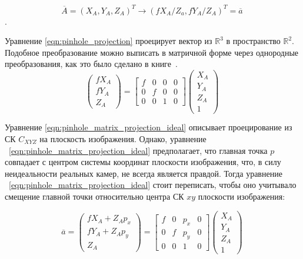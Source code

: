 \documentclass[12pt, a4paper]{article}
\begin{document}
\begin{equation}
    \overline{A} = (X_A, Y_A, Z_A)^T \rightarrow (fX_A/Z_a, fY_A/Z_A)^T = \overline{a} 
~\label{eqn:pinhole_projection}
\end{equation}.

Уравнение \eqref{eqn:pinhole_projection} проецирует вектор из $\mathbb{R}^3$ в
пространство $\mathbb{R}^2$. Подобное преобразование можно выписать в матричной
форме через однородные преобразования, как это было сделано в книге~\cite{multiview_cv}.
\begin{equation}
    \begin{pmatrix}
        f X_A \\
        f Y_A \\
        Z_A
    \end{pmatrix} = 
    \begin{bmatrix}
        f & 0 & 0 & 0 \\
        0 & f & 0 & 0 \\
        0 & 0 & 1 & 0
    \end{bmatrix} \begin{pmatrix}
        X_A\\
        Y_A\\
        Z_A\\
        1
    \end{pmatrix}
~\label{eqn:pinhole_matrix_projection_ideal}
\end{equation}

\par

Уравнение \eqref{eqn:pinhole_matrix_projection_ideal} описывает проецирование из
СК $C_{XYZ}$ на плоскость изображения.  Однако, уравнение
~\eqref{eqn:pinhole_matrix_projection_ideal} предполагает, что главная точка $p$
совпадает с центром системы координат плоскости изображения, что, в силу
неидеальности реальных камер, не всегда является правдой. Тогда уравнение
~\eqref{eqn:pinhole_matrix_projection_ideal} стоит переписать, чтобы оно
учитывало смещение главной точки относительно центра СК $xy$ плоскости
изображения:
    
\begin{equation}
    \overline{a} = \begin{pmatrix}
        fX_A + Z_A p_x\\
        fY_A + Z_A p_y\\
        Z_A
    \end{pmatrix} = \begin{bmatrix}
        f & 0 & p_x & 0 \\
        0 & f & p_y & 0 \\
        0 & 0 & 1 & 0
    \end{bmatrix} \begin{pmatrix}
        X_A\\
        Y_A\\
        Z_A\\
        1
    \end{pmatrix}
~\label{eqn:pinhole_matrix_projection_real}
\end{equation}
\end{document}
